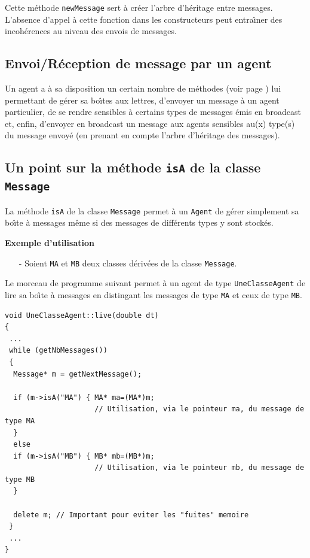 \documentclass[12pt]{article}
\begin{document}
Cette m\'ethode {\tt newMessage} sert \`a cr\'eer l'arbre d'h\'eritage
entre messages.
L'absence d'appel \`a cette fonction dans les constructeurs peut
entra\^ \i ner des incoh\'erences au niveau des envois de messages.

\vspace{-0.2cm}
\subsection{Envoi/R\'eception de message par un agent}

Un agent a \`a sa disposition un certain nombre de m\'ethodes
(voir page \pageref{boite}) lui permettant
de g\'erer sa bo\^ \i tes aux lettres, d'envoyer un message \`a un agent
particulier, de se rendre sensibles \`a certains types de messages \'emis
en broadcast et, enfin, d'envoyer en broadcast un message aux agents
sensibles au(x) type(s) du message envoy\'e (en prenant en compte
l'arbre d'h\'eritage des messages).

\vspace{-0.2cm}
\subsection{Un point sur la m\'ethode
{\tt isA} de la classe {\tt Message}}

La m\'ethode {\tt isA} de la classe {\tt Message} permet \`a
un {\tt Agent} de g\'erer simplement sa bo\^ \i te \`a messages
m\^eme si des messages de diff\'erents types y sont stock\'es.

\vspace{0.3cm}

{\bf Exemple d'utilisation}

\begin{itemize}
\item[-] Soient {\tt MA} et {\tt MB} deux classes d\'eriv\'ees de la
classe {\tt Message}.
\end{itemize}

Le morceau de programme suivant permet \`a un agent de type
{\tt UneClasseAgent} de lire sa bo\^ \i te \`a messages
en distingant les messages de type {\tt MA} et ceux de type {\tt MB}.

\begin{footnotesize}
\begin{verbatim}
void UneClasseAgent::live(double dt)
{
 ...
 while (getNbMessages())
 {
  Message* m = getNextMessage();

  if (m->isA("MA") { MA* ma=(MA*)m;
                     // Utilisation, via le pointeur ma, du message de type MA
  }
  else
  if (m->isA("MB") { MB* mb=(MB*)m;
                     // Utilisation, via le pointeur mb, du message de type MB
  }

  delete m; // Important pour eviter les "fuites" memoire
 }
 ...
}
\end{verbatim}
\end{footnotesize}
\end{document}
